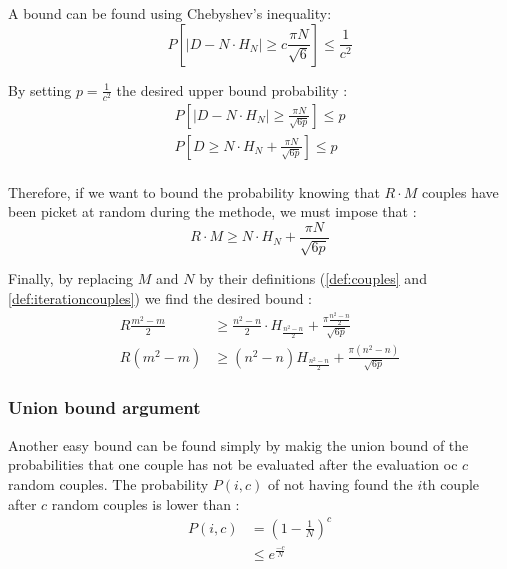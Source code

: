 A bound can be found using Chebyshev's inequality: 
\begin{equation}
    \label{eqn:chebshev}
    P[\lvert D - N\cdot H_N\lvert \ge c \frac{\pi N }{\sqrt{6}}] \le \frac{1}{c^2}
\end{equation}

By setting $p = \frac{1}{c^2}$ the desired upper bound probability :
\begin{equation}
    \label{eqn:prob_cheb}
    \begin{split}
    P[\lvert D -N \cdot H_N\lvert \ge \frac{\pi N}{\sqrt{6p}}] \le p \\
    P[D \ge N \cdot H_N +\frac{\pi N}{\sqrt{6p}}] \le p \\
    \end{split}
\end{equation}

Therefore, if we want to bound the probability knowing that $R\cdot M$ couples have been picket at random during the methode, we must impose that :
\begin{equation}
    \label{prob_bound}
    R\cdot M \ge N\cdot H_N + \frac{\pi N}{\sqrt{6p}}  
\end{equation}

Finally, by replacing $M$ and $N$ by their definitions (\ref{def:couples} and \ref{def:iterationcouples}) we find the desired bound :
\begin{equation}
    \begin{split}
     R\frac{m^2 -m }{2} & \ge \frac{n^2-n}{2}\cdot H_\frac{n^2-n}{2}  + \frac{\pi \frac{n^2-n}{2}}{\sqrt{6p}} \\ 
     R(m^2 -m) & \ge (n^2-n) H_\frac{n^2-n}{2} + \frac{\pi (n^2-n)}{\sqrt{6p}} 
    \end{split}
    \label{eqn:mr_values_cheb_bound}
\end{equation}

\subsubsection{Union bound argument}
Another easy bound can be found simply by makig the union bound of the probabilities that one couple has not be evaluated after the evaluation oc $c$ random couples.
The probability $P(i,c)$ of not having found the $i$th couple after $c$ random couples is lower than :
\begin{equation}
    \begin{split}
    P(i,c) & = (1-\frac{1}{N})^c \\
    & \le e^{\frac{-c}{N}}
    \end{split}
    \label{eqn:bound_p_for_i}
\end{equation}

